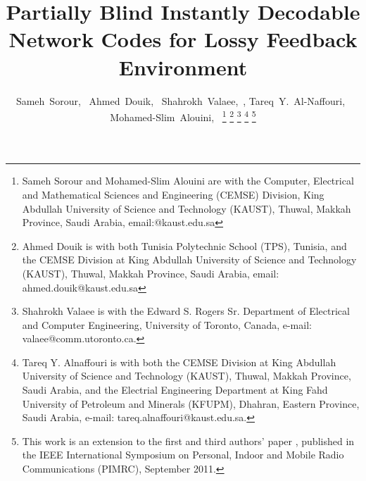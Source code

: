 \documentclass[10pt,jounral]{IEEEtran}
\begin{document}

\title{Partially Blind Instantly Decodable Network Codes for Lossy Feedback Environment}
\author{Sameh~Sorour,~ Ahmed~Douik,~
        Shahrokh~Valaee,~, Tareq~Y.~Al-Naffouri,~ Mohamed-Slim~Alouini,~
\thanks{Sameh Sorour and Mohamed-Slim Alouini are with the Computer, Electrical and Mathematical Sciences and Engineering (CEMSE) Division, King Abdullah University of Science and Technology (KAUST), Thuwal, Makkah Province, Saudi Arabia, email:@kaust.edu.sa}
\thanks{Ahmed Douik is with both Tunisia Polytechnic School (TPS), Tunisia, and the CEMSE Division at King Abdullah University of Science and Technology (KAUST), Thuwal, Makkah Province, Saudi Arabia, email: ahmed.douik@kaust.edu.sa}
\thanks{Shahrokh Valaee is with the Edward S. Rogers Sr. Department of Electrical and Computer Engineering,
    University of Toronto, Canada, e-mail: valaee@comm.utoronto.ca.}
    \thanks{Tareq Y. Alnaffouri is with both the CEMSE Division at King Abdullah University of Science and Technology (KAUST), Thuwal, Makkah Province, Saudi Arabia, and the Electrial Engineering Department at King Fahd University of Petroleum and Minerals (KFUPM), Dhahran, Eastern Province, Saudi Arabia, e-mail: tareq.alnaffouri@kaust.edu.sa.}
    \thanks{This work is an extension to the first and third authors' paper \cite{PIMRC11}, published in the IEEE International Symposium on Personal, Indoor and Mobile Radio Communications (PIMRC), September 2011.}
     }

\maketitle

\IEEEoverridecommandlockouts
\end{document}
